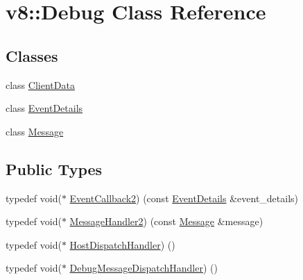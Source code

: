 \hypertarget{classv8_1_1_debug}{}\section{v8\+:\+:Debug Class Reference}
\label{classv8_1_1_debug}
\subsection*{Classes}
\begin{DoxyCompactItemize}
\item 
class \hyperlink{classv8_1_1_debug_1_1_client_data}{Client\+Data}
\item 
class \hyperlink{classv8_1_1_debug_1_1_event_details}{Event\+Details}
\item 
class \hyperlink{classv8_1_1_debug_1_1_message}{Message}
\end{DoxyCompactItemize}
\subsection*{Public Types}
\begin{DoxyCompactItemize}
\item 
typedef void($\ast$ \hyperlink{classv8_1_1_debug_aae787219311eeedcbbe2c63cf36d1e53}{Event\+Callback2}) (const \hyperlink{classv8_1_1_debug_1_1_event_details}{Event\+Details} \&event\+\_\+details)
\item 
typedef void($\ast$ \hyperlink{classv8_1_1_debug_a0fb8f7e1f8fa47cb23f7ad72cd533c77}{Message\+Handler2}) (const \hyperlink{classv8_1_1_debug_1_1_message}{Message} \&message)
\item 
typedef void($\ast$ \hyperlink{classv8_1_1_debug_a442f686afe7d80928b57b3ff8ac3f6e7}{Host\+Dispatch\+Handler}) ()
\item 
typedef void($\ast$ \hyperlink{classv8_1_1_debug_a91cd8aa9743e3478bc63fe73abcd557c}{Debug\+Message\+Dispatch\+Handler}) ()
\end{DoxyCompactItemize}
